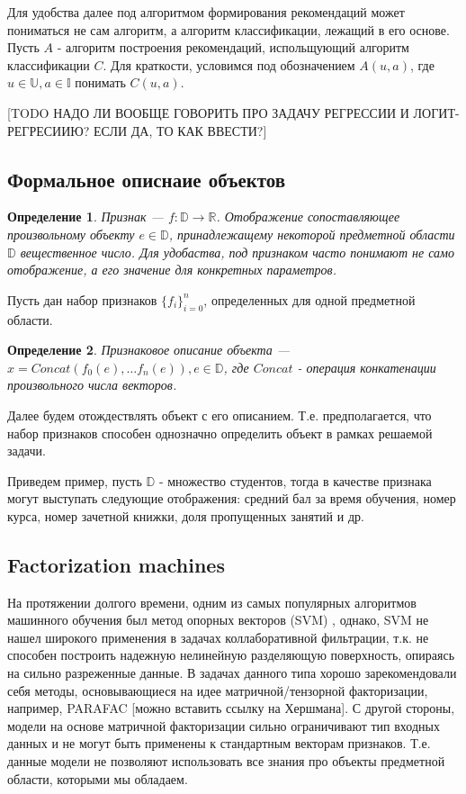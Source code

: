 \documentclass[12pt,a4paper]{report}
\begin{document}
Для удобства далее под алгоритмом формирования рекомендаций может пониматься не сам алгоритм, а алгоритм классификации, лежащий в его основе. Пусть $A$ - алгоритм построения рекомендаций, испольщующий алгоритм классификации $C$. Для краткости, условимся под обозначением $A(u, a)$, где $u \in \mathbb{U}, a \in \mathbb{I}$ понимать $C(u, a)$.

[TODO НАДО ЛИ ВООБЩЕ ГОВОРИТЬ ПРО ЗАДАЧУ РЕГРЕССИИ И ЛОГИТ-РЕГРЕСИИЮ? ЕСЛИ ДА, ТО КАК ВВЕСТИ?]

\subsection{Формальное описнаие объектов}
\newtheorem{Def}{Определение}
\begin{Def}
Признак --- $f: \mathbb{D}  \to \mathbb{R}$. Отображение сопоставляющее произвольному объекту $e \in \mathbb{D}$, принадлежащему некоторой предметной области $\mathbb{D}$ вещественное число. Для удобаства, под признаком часто понимают не само отображение, а его значение для конкретных параметров.
\end{Def}

Пусть дан набор признаков $\{f_i\}_{i=0}^n$, определенных для одной предметной области.
\begin{Def}
Признаковое описание объекта --- $x = Concat(f_0(e), \dots f_n(e)), e \in \mathbb{D}$, где $Concat$ - операция конкатенации произвольного числа векторов.
\end{Def}
Далее будем отождествлять объект с его описанием. Т.е. предполагается, что набор признаков способен однозначно определить объект в рамках решаемой задачи.

Приведем пример, пусть $\mathbb{D}$ - множество студентов, тогда в качестве признака могут выступать следующие отображения: средний бал за время обучения, номер курса, номер зачетной книжки, доля пропущенных занятий и др.

\subsection{Factorization machines}
На протяжении долгого времени, одним из самых популярных алгоритмов машинного обучения был метод опорных векторов (SVM) , однако, SVM не нашел широкого применения в задачах коллаборативной фильтрации, т.к. не способен построить надежную нелинейную разделяющую поверхность, опираясь на сильно разреженные данные. В задачах данного типа хорошо зарекомендовали себя методы, основывающиеся на идее матричной/тензорной факторизации, например, PARAFAC [можно вставить ссылку на Хершмана]. С другой стороны, модели на основе матричной факторизации сильно ограничивают тип входных данных и не могут быть применены к стандартным векторам признаков. Т.е. данные модели не позволяют использовать все знания про объекты предметной области, которыми мы обладаем.
\end{document}
